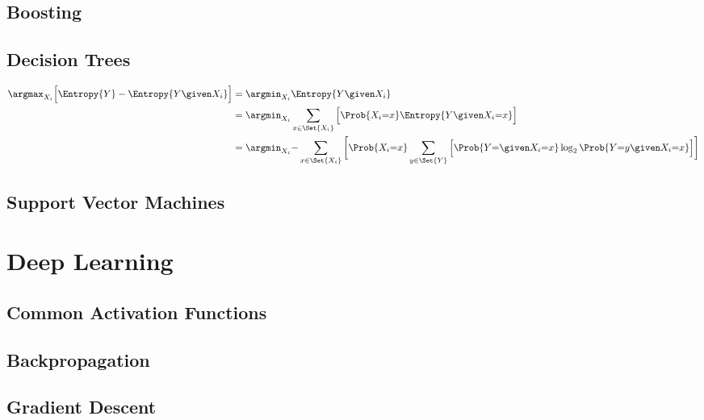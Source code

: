 \documentclass[18pt,a3paper,landscape, ncols=3]{cheatsheet}
\begin{document}
	\subsection{Boosting}
		\begin{mdframed}
		\end{mdframed}
	\subsection{Decision Trees}
		\begin{mdframed}
			\begin{align*}
		    \argmax_{X_i} \Big\lbrack \Entropy{Y} - \Entropy{Y \given X_i} \Big\rbrack 
		      &= \argmin_{X_i} \Entropy{Y \given X_i} \\
		      &= \argmin_{X_i} \sum_{x \in \Set{X_i}} \Big\lbrack \Prob{X_i{=}x} \Entropy{Y \given X_i{=}x} \Big\rbrack \\
		      &= \argmin_{X_i} {-} \sum_{x \in \Set{X_i}} \bigg\lbrack \Prob{X_i{=}x} \sum_{y \in \Set{Y}} \Big\lbrack \Prob{Y{=} \given X_i{=}x} \log_2 \Prob{Y{=}y \given X_i{=}x} \Big\rbrack \bigg\rbrack
		  \end{align*}
		\end{mdframed}
	\subsection{Support Vector Machines}
		\begin{mdframed}
		\end{mdframed}

\section{Deep Learning} \seperator
	\subsection{Common Activation Functions}
		\begin{mdframed}
		\end{mdframed}
	\subsection{Backpropagation}
		\begin{mdframed}
		\end{mdframed}
	\subsection{Gradient Descent}
		\begin{mdframed}
		\end{mdframed}
\end{document}
